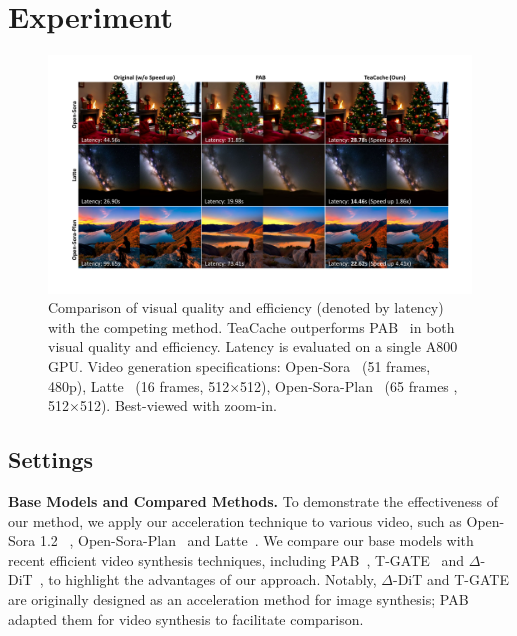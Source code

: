 


\section{Experiment}

\begin{figure}
  \centering
  \includegraphics[width=0.98\linewidth]{figs/tisser.pdf}
  \caption{
  Comparison of visual quality and efficiency (denoted by latency) with the competing method. TeaCache outperforms PAB~\cite{zhao2024real} in both visual quality and efficiency. Latency is evaluated on a single A800 GPU. Video generation specifications: Open-Sora~\cite{Open-Sora} (51 frames, 480p), Latte~\cite{ma2024latte} (16 frames, 512$\times$512), Open-Sora-Plan~\cite{Open-Sora-Plan} (65 frames , 512$\times$512). Best-viewed with zoom-in.
  }
  \label{fig:show}
\end{figure}



\subsection{Settings}
\textbf{Base Models and Compared Methods.} To demonstrate the effectiveness of our method, we apply our acceleration technique to various video, such as Open-Sora 1.2 ~\cite{Open-Sora}, Open-Sora-Plan~\cite{Open-Sora-Plan} and Latte~\cite{ma2024latte}. We compare our base models with recent efficient video synthesis techniques, including PAB~\cite{zhao2024real}, T-GATE~\cite{zhang2024cross} and $\Delta$-DiT~\cite{chen2024delta}, to highlight the advantages of our approach. Notably, $\Delta$-DiT and T-GATE are originally designed as an acceleration method for image synthesis; PAB adapted them for video synthesis to facilitate comparison. 

